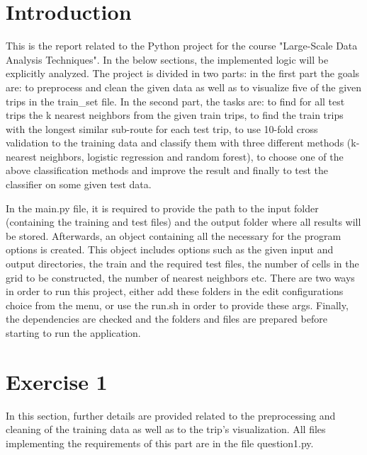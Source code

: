 \documentclass[12pt]{article}
\begin{document}
	\section{Introduction}
    This is the report related to the Python project for the course "Large-Scale Data Analysis Techniques". In the below sections, the implemented logic will be explicitly analyzed. The project is divided in two parts: in the first part the goals are: to preprocess and clean the given data as well as to visualize five of the given trips in the train\_set file. In the second part, the tasks are: to find for all test trips the k nearest neighbors from the given train trips, to find the train trips with the longest similar sub-route for each test trip, to use 10-fold cross validation to the training data and classify them with three different methods (k-nearest neighbors, logistic regression and random forest), to choose one of the above classification methods and improve the result and finally to test the classifier on some given test data.
    
    In the main.py file, it is required to provide the path to the input folder (containing the training and test files) and the output folder where all results will be stored. Afterwards, an object containing all the necessary for the program options is created. This object includes options such as the given input and output directories, the train and the required test files, the number of cells in the grid to be constructed, the number of nearest neighbors etc. There are two ways in order to run this project, either add these folders in the edit configurations choice from the menu, or use the run.sh in order to provide these args. Finally, the dependencies are checked and the folders and files are prepared before starting to run the application.
    
	\section{Exercise 1}
	In this section, further details are provided related to the preprocessing and cleaning of the training data as well as to the trip's visualization. All files implementing the requirements of this part are in the file question1.py.
	
\end{document}

